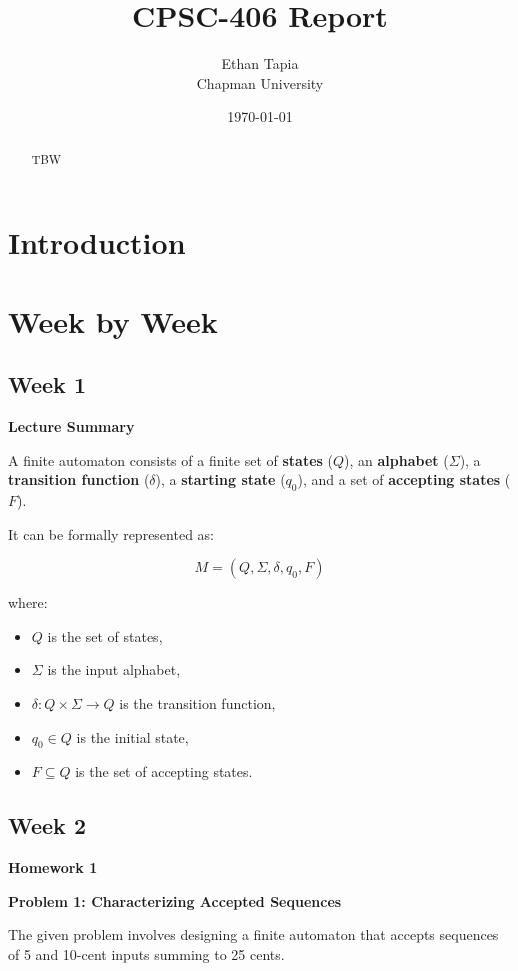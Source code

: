 \documentclass{article}
\title{CPSC-406 Report}
\author{Ethan Tapia  \\ Chapman University}
\date{\today}
\theoremstyle{theorem}
\theoremstyle{definition}
\theoremstyle{remark}
\begin{document}
\maketitle

\begin{abstract}
TBW
\end{abstract}

\setcounter{tocdepth}{3}
\tableofcontents

\section{Introduction}\label{intro}


\section{Week by Week}\label{homework}

\subsection{Week 1}
\textbf{Lecture Summary}

A finite automaton consists of a finite set of \textbf{states} ($Q$), an \textbf{alphabet} ($\Sigma$), a \textbf{transition function} ($\delta$), a \textbf{starting state} ($q_0$), and a set of \textbf{accepting states} ($F$). 

It can be formally represented as:

\[
M = (Q, \Sigma, \delta, q_0, F)
\]

where:
\begin{itemize}
    \item $Q$ is the set of states,
    \item $\Sigma$ is the input alphabet,
    \item $\delta: Q \times \Sigma \to Q$ is the transition function,
    \item $q_0 \in Q$ is the initial state,
    \item $F \subseteq Q$ is the set of accepting states.
\end{itemize}



\subsection{Week 2}
{\textbf{{Homework 1}}}

\textbf{Problem 1: Characterizing Accepted Sequences}

The given problem involves designing a finite automaton that accepts sequences of 5 and 10-cent inputs summing to 25 cents.
\end{document}
